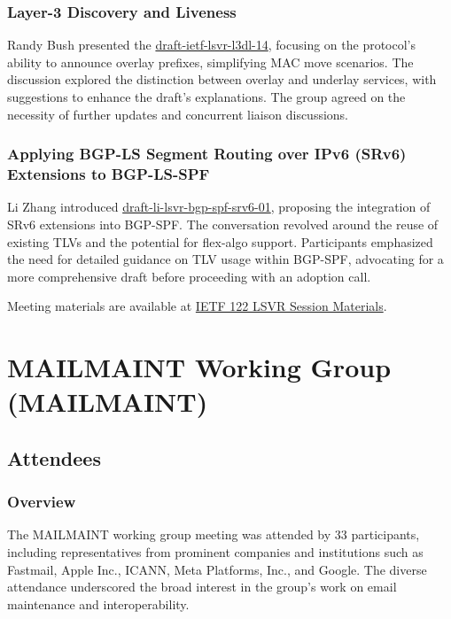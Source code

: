 \documentclass{article}
\begin{document}
\subsubsection{Layer-3 Discovery and Liveness}
Randy Bush presented the \href{https://datatracker.ietf.org/doc/html/draft-ietf-lsvr-l3dl-14}{draft-ietf-lsvr-l3dl-14}, focusing on the protocol's ability to announce overlay prefixes, simplifying MAC move scenarios. The discussion explored the distinction between overlay and underlay services, with suggestions to enhance the draft's explanations. The group agreed on the necessity of further updates and concurrent liaison discussions.

\subsubsection{Applying BGP-LS Segment Routing over IPv6 (SRv6) Extensions to BGP-LS-SPF}
Li Zhang introduced \href{https://datatracker.ietf.org/doc/html/draft-li-lsvr-bgp-spf-srv6-01}{draft-li-lsvr-bgp-spf-srv6-01}, proposing the integration of SRv6 extensions into BGP-SPF. The conversation revolved around the reuse of existing TLVs and the potential for flex-algo support. Participants emphasized the need for detailed guidance on TLV usage within BGP-SPF, advocating for a more comprehensive draft before proceeding with an adoption call.

Meeting materials are available at \href{https://datatracker.ietf.org/meeting/122/session/lsvr}{IETF 122 LSVR Session Materials}.



\newpage

\section{MAILMAINT Working Group (MAILMAINT)}

\subsection{Attendees}
\subsubsection{Overview}
The MAILMAINT working group meeting was attended by 33 participants, including representatives from prominent companies and institutions such as Fastmail, Apple Inc., ICANN, Meta Platforms, Inc., and Google. The diverse attendance underscored the broad interest in the group's work on email maintenance and interoperability.
\end{document}
